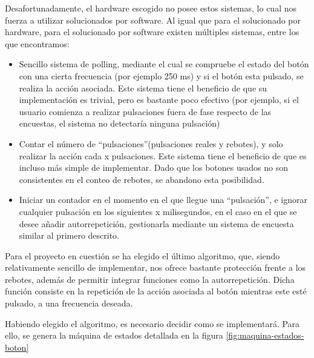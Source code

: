 \documentclass[12pt,letterpaper]{article}
\begin{document}
Desafortunadamente, el hardware escogido no posee estos sistemas, lo
cual nos fuerza a utilizar solucionados por software. Al igual que
para el solucionado por hardware, para el solucionado por software
existen múltiples sistemas, entre los que encontramos:
\begin{itemize}
  \item Sencillo sistema de polling, mediante el cual se compruebe el
    estado del botón con una cierta frecuencia (por ejemplo 250 ms) y
    si el botón esta pulsado, se realiza la acción asociada. Este
    sistema tiene el beneficio de que su implementación es trivial,
    pero es bastante poco efectivo (por ejemplo, si el usuario
    comienza a realizar pulsaciones fuera de fase respecto de las
    encuestas, el sistema no detectaría ninguna pulsación)
  \item Contar el número de ``pulsaciones''(pulsaciones reales y
    rebotes), y solo realizar la acción cada x pulsaciones. Este
    sistema tiene el beneficio de que es incluso más simple de
    implementar. Dado que los botones usados no son consistentes
    en el conteo de rebotes, se abandono esta posibilidad.
  \item Iniciar un contador en el momento en el que llegue una
    ``pulsación'', e ignorar cualquier pulsación en los siguientes x
    milisegundos, en el caso en el que se desee añadir autorrepetición,
    gestionarla mediante un sistema de encuesta similar al primero
    descrito.
\end{itemize}

Para el proyecto en cuestión se ha elegido el último algoritmo, que,
siendo relativamente sencillo de implementar, nos ofrece bastante
protección frente a los rebotes, además de permitir integrar funciones
como la autorrepetición. Dicha función consiste en la repetición de la
acción asociada al botón mientras este esté pulsado, a una frecuencia
deseada.

Habiendo elegido el algoritmo, es necesario decidir como se
implementará. Para ello, se genera la máquina de estados detallada en
la figura \ref{fig:maquina-estados-boton}
\end{document}
